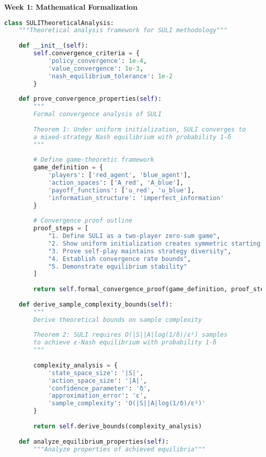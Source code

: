 \documentclass[12pt,a4paper]{article}
\begin{document}
\textbf{Week 1: Mathematical Formalization}
\begin{lstlisting}[language=Python, caption=Theoretical Analysis Framework]
class SULITheoreticalAnalysis:
    """Theoretical analysis framework for SULI methodology"""
    
    def __init__(self):
        self.convergence_criteria = {
            'policy_convergence': 1e-4,
            'value_convergence': 1e-3,
            'nash_equilibrium_tolerance': 1e-2
        }
    
    def prove_convergence_properties(self):
        """
        Formal convergence analysis of SULI
        
        Theorem 1: Under uniform initialization, SULI converges to 
        a mixed-strategy Nash equilibrium with probability 1-δ
        """
        
        # Define game-theoretic framework
        game_definition = {
            'players': ['red_agent', 'blue_agent'],
            'action_spaces': ['A_red', 'A_blue'],
            'payoff_functions': ['u_red', 'u_blue'],
            'information_structure': 'imperfect_information'
        }
        
        # Convergence proof outline
        proof_steps = [
            "1. Define SULI as a two-player zero-sum game",
            "2. Show uniform initialization creates symmetric starting point",
            "3. Prove self-play maintains strategy diversity",
            "4. Establish convergence rate bounds",
            "5. Demonstrate equilibrium stability"
        ]
        
        return self.formal_convergence_proof(game_definition, proof_steps)
    
    def derive_sample_complexity_bounds(self):
        """
        Derive theoretical bounds on sample complexity
        
        Theorem 2: SULI requires O(|S||A|log(1/δ)/ε²) samples
        to achieve ε-Nash equilibrium with probability 1-δ
        """
        
        complexity_analysis = {
            'state_space_size': '|S|',
            'action_space_size': '|A|',
            'confidence_parameter': 'δ',
            'approximation_error': 'ε',
            'sample_complexity': 'O(|S||A|log(1/δ)/ε²)'
        }
        
        return self.derive_bounds(complexity_analysis)
    
    def analyze_equilibrium_properties(self):
        """Analyze properties of achieved equilibria"""
        

\end{lstlisting}
\end{document}
